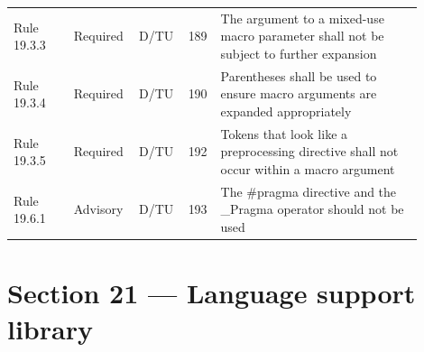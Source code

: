 \documentclass[10pt,letterpaper]{article}
\begin{document}
\begin{longtable}{p{0.14\linewidth}p{0.14\linewidth}p{0.1\linewidth}p{0.045\linewidth}p{0.475\linewidth}}
Rule 19.3.3 & Required & D/TU & 189 & The argument to a mixed-use macro parameter shall not be subject to further expansion\\
Rule 19.3.4 & Required & D/TU & 190 & Parentheses shall be used to ensure macro arguments are expanded appropriately\\
Rule 19.3.5 & Required & D/TU & 192 & Tokens that look like a preprocessing directive shall not occur within a macro argument\\
Rule 19.6.1 & Advisory & D/TU & 193 & The \#pragma directive and the \_Pragma operator should not be used\\
\bottomrule
\end{longtable}
\normalsize

\section{Section 21 --- Language support library}
\small\setlength{\tabcolsep}{3pt}\renewcommand{\arraystretch}{1.15}
\end{document}
